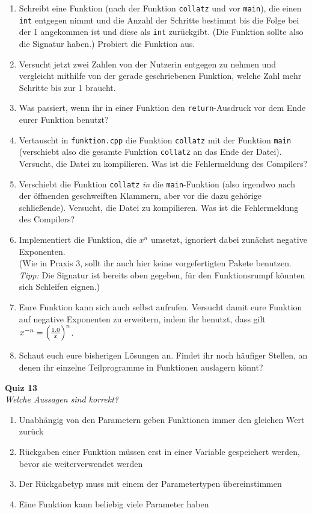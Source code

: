 \begin{spiel}
\begin{enumerate}
	\item Schreibt eine Funktion (nach der Funktion \texttt{collatz} und vor \texttt{main}), die einen \texttt{int} entgegen nimmt und die Anzahl der Schritte bestimmt bis die Folge bei der 1 angekommen ist und diese als \texttt{int} zurückgibt.
	(Die Funktion sollte also die Signatur  haben.)
	Probiert die Funktion aus.
	\item Versucht jetzt zwei Zahlen von der Nutzerin entgegen zu nehmen und vergleicht mithilfe von der gerade geschriebenen Funktion, welche Zahl mehr Schritte bis zur 1 braucht.
    \item Was passiert, wenn ihr in einer Funktion den \texttt{return}-Ausdruck vor dem Ende eurer Funktion benutzt?
    \item Vertauscht in \texttt{funktion.cpp} die Funktion \texttt{collatz} mit der Funktion \texttt{main} (verschiebt also die gesamte Funktion \texttt{collatz} an das Ende der Datei).
        Versucht, die Datei zu kompilieren.
        Was ist die Fehlermeldung des Compilers?
    \item Verschiebt die Funktion \texttt{collatz} \emph{in} die \texttt{main}-Funktion (also irgendwo nach der öffnenden geschweiften Klammern, aber vor die dazu gehörige schließende).
        Versucht, die Datei zu kompilieren. Was ist die Fehlermeldung des Compilers?
    \item Implementiert die Funktion, die $x^n$ umsetzt, ignoriert dabei zunächst negative Exponenten. \\
        (Wie in Praxis 3, sollt ihr auch hier keine vorgefertigten Pakete benutzen. \emph{Tipp:} Die Signatur ist bereits oben gegeben, für den Funktionsrumpf könnten sich Schleifen eignen.)
    \item Eure Funktion kann sich auch selbst aufrufen. Versucht damit eure Funktion auf negative Exponenten zu erweitern, indem ihr benutzt, dass gilt $x^{-n} = \Bigl(\frac{1.0}{x}\Bigr)^n$.
    \item Schaut euch eure bisherigen Lösungen an.
        Findet ihr noch häufiger Stellen, an denen ihr einzelne Teilprogramme in Funktionen auslagern könnt?
\end{enumerate}
\end{spiel}

\textbf{Quiz 13}\\
\textit{Welche Aussagen sind korrekt?}
\begin{enumerate}[label=\alph*)]
    \item Unabhängig von den Parametern geben Funktionen immer den gleichen Wert zurück
    \item Rückgaben einer Funktion müssen erst in einer Variable gespeichert werden, bevor sie weiterverwendet werden
    \item Der Rückgabetyp muss mit einem der Parametertypen übereinstimmen
    \item Eine Funktion kann beliebig viele Parameter haben
\end{enumerate}


